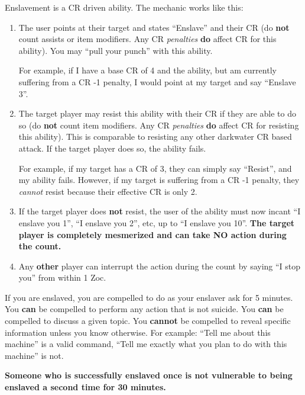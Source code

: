 \documentclass[green]{elementals}
\begin{document}
\name{\gEnslave{}} 

Enslavement is a CR driven ability. The mechanic works like this:

\begin{enumerate}
 \item The user points at their target and states ``Enslave'' and their CR (do {\bf not} count assists or item modifiers. Any CR \emph{penalties} {\bf do} affect CR for this ability). You may ``pull your punch'' with this ability. 
 
 For example, if I have a base CR of 4 and the ability, but am currently suffering from a CR -1 penalty, I would point at my target and say ``Enslave 3''. 
 
 \item The target player may resist this ability with their CR if they are able to do so (do {\bf not} count item modifiers. Any CR \emph{penalties} {\bf do} affect CR for resisting this ability). This is comparable to resisting any other darkwater CR based attack. If the target player does so, the ability fails. 
 
 For example, if my target has a CR of 3, they can simply say ``Resist'', and my ability fails.
 However, if my target is suffering from a CR -1 penalty, they \emph{cannot} resist because their effective CR is only 2.
 
 \item If the target player does {\bf not} resist, the user of the ability must now incant ``I enslave you 1'', ``I enslave you 2'', etc, up to ``I enslave you 10''. {\bf The target player is completely mesmerized and can take NO action during the count.}
 
 \item Any {\bf other} player can interrupt the action during the count by saying ``I stop you'' from within 1 Zoc.
\end{enumerate}

If you are enslaved, you are compelled to do as your enslaver ask for 5 minutes. You {\bf can} be compelled to perform any action that is not suicide. You {\bf can} be compelled  to discuss a given topic. You {\bf cannot} be compelled to reveal specific information unless you know otherwise. For example: ``Tell me about this machine'' is a valid command, ``Tell me exactly what you plan to do with this machine'' is not.

{\bf Someone who is successfully enslaved once is not vulnerable to being enslaved a second time for 30 minutes.}
\end{document}
